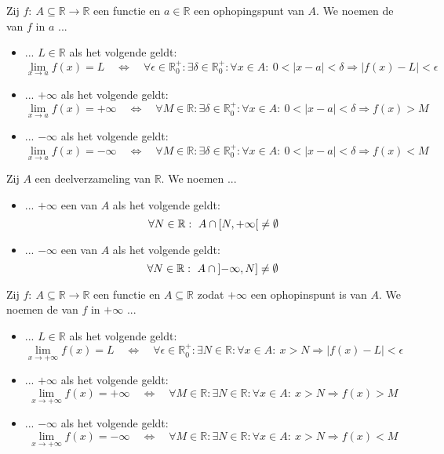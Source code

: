 \documentclass[main.tex]{subfiles}
\begin{document}
\begin{de}
  Zij $f:\ A \subseteq \mathbb{R} \rightarrow \mathbb{R}$ een functie en $a\in \mathbb{R}$ een ophopingspunt van $A$.
  We noemen de  van $f$ in $a$ ...
  \begin{itemize}
  \item ... $L\in \mathbb{R}$ als het volgende geldt:
    \[
    \lim_{x\rightarrow a}f(x) = L \quad\Leftrightarrow\quad
    \forall \epsilon \in \mathbb{R}_{0}^{+}: \exists \delta \in \mathbb{R}_{0}^{+}: \forall x\in A:\ 0 < |x-a| < \delta \Rightarrow |f(x) - L| < \epsilon
    \]
  \item ... $+\infty$ als het volgende geldt:
    \[
    \lim_{x\rightarrow a}f(x) = +\infty\quad\Leftrightarrow\quad
    \forall M \in \mathbb{R}: \exists \delta \in \mathbb{R}_{0}^{+}: \forall x\in A:\ 0 < |x-a| < \delta \Rightarrow f(x) > M
    \]
  \item ... $-\infty$ als het volgende geldt:
    \[
    \lim_{x\rightarrow a}f(x) = -\infty\quad\Leftrightarrow\quad
    \forall M \in \mathbb{R}: \exists \delta \in \mathbb{R}_{0}^{+}: \forall x\in A:\ 0 < |x-a| < \delta \Rightarrow f(x) < M
    \]
  \end{itemize}
\end{de}

\begin{de}
  Zij $A$ een deelverzameling van $\mathbb{R}$.
  We noemen ...
  \begin{itemize}
  \item ... $+\infty$ een  van $A$ als het volgende geldt:
    \[ \forall N \in \mathbb{R}:\ A \cap \interval[open right]{N}{+\infty} \neq \emptyset \]
  \item ... $-\infty$ een  van $A$ als het volgende geldt:
    \[ \forall N \in \mathbb{R}:\ A \cap \interval[open left]{-\infty}{N} \neq \emptyset \]
  \end{itemize}
\end{de}

\begin{de}
  Zij $f:\ A \subseteq \mathbb{R} \rightarrow \mathbb{R}$ een functie en $A \subseteq \mathbb{R}$ zodat $+\infty$ een ophopinspunt is van $A$.
  We noemen de  van $f$ in $+\infty$ ...
  \begin{itemize}
  \item ... $L\in \mathbb{R}$ als het volgende geldt:
    \[
    \lim_{x\rightarrow +\infty}f(x) = L \quad\Leftrightarrow\quad
    \forall \epsilon \in \mathbb{R}_{0}^{+}: \exists N \in \mathbb{R}: \forall x\in A:\ x > N \Rightarrow |f(x) - L| < \epsilon
    \]
  \item ... $+\infty$ als het volgende geldt:
    \[
    \lim_{x\rightarrow +\infty}f(x) = +\infty\quad\Leftrightarrow\quad
    \forall M \in \mathbb{R}: \exists N \in \mathbb{R}: \forall x\in A:\ x > N \Rightarrow f(x) > M
    \]
  \item ... $-\infty$ als het volgende geldt:
    \[
    \lim_{x\rightarrow +\infty}f(x) = -\infty\quad\Leftrightarrow\quad
    \forall M \in \mathbb{R}: \exists N \in \mathbb{R}: \forall x\in A:\ x > N \Rightarrow f(x) < M
    \]
  \end{itemize}
\end{de}
\end{document}
